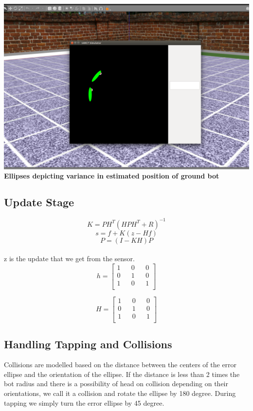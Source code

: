 \documentclass[12pt]{article}
\begin{document}
\begin{center}\includegraphics[scale=0.1]{activeloc} \\
    \textbf{Ellipses depicting variance in estimated position of ground bot}\end{center}
    
\subsection{Update Stage}
    
\[ K = PH^{T}(HPH^{T} + R)^{-1}\]
\[ s = f + K(z - Hf)\]
\[ P = (I - KH)P\]
\\
z is the update that we get from the sensor.
\[
h=
  \begin{bmatrix}
    1 && 0 && 0\\
    0 && 1 && 0\\
    1 && 0 && 1\\
  \end{bmatrix}
\]

\[
H=
  \begin{bmatrix}
    1 && 0 && 0\\
    0 && 1 && 0\\
    1 && 0 && 1\\
  \end{bmatrix}
\]

\subsection{Handling Tapping and Collisions}

Collisions are modelled based on the distance between the centers of the error ellipse and the orientation of the ellipse.
If the distance is less than 2 times the bot radius and there is a possibility of head on collision depending on their orientations, we call it a collision and rotate the ellipse by 180 degree. During tapping we simply turn the error ellipse by 45 degree.\\
\end{document}
